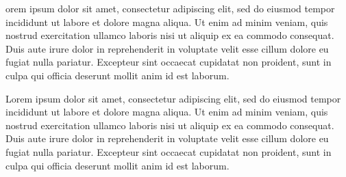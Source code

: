 \documentclass{exam}
\begin{document}
\begin{questions}

\question[7]
	orem ipsum dolor sit amet, consectetur adipiscing elit, sed do eiusmod tempor incididunt ut labore et dolore magna aliqua. Ut enim ad minim veniam, quis nostrud exercitation ullamco laboris nisi ut aliquip ex ea commodo consequat. Duis aute irure dolor in reprehenderit in voluptate velit esse cillum dolore eu fugiat nulla pariatur. Excepteur sint occaecat cupidatat non proident, sunt in culpa qui officia deserunt mollit anim id est laborum.

\question[7]
	Lorem ipsum dolor sit amet, consectetur adipiscing elit, sed do eiusmod tempor incididunt ut labore et dolore magna aliqua. Ut enim ad minim veniam, quis nostrud exercitation ullamco laboris nisi ut aliquip ex ea commodo consequat. Duis aute irure dolor in reprehenderit in voluptate velit esse cillum dolore eu fugiat nulla pariatur. Excepteur sint occaecat cupidatat non proident, sunt in culpa qui officia deserunt mollit anim id est laborum.


\end{questions}
\end{document}
